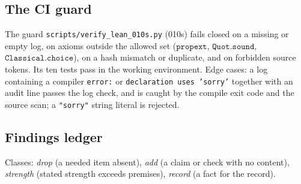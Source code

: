 \documentclass[11pt,a4paper]{article}
\theoremstyle{plain}
\theoremstyle{definition}
\theoremstyle{remark}
\begin{document}
\subsection{The CI guard}
The guard \texttt{scripts/verify\_lean\_010s.py} (010s) fails closed on a missing or empty log, on axioms outside the allowed set ($\texttt{propext}$, $\texttt{Quot.sound}$, $\texttt{Classical.choice}$), on a hash mismatch or duplicate, and on forbidden source tokens. Its ten tests pass in the working environment. Edge cases: a log containing a compiler \texttt{error:} or \texttt{declaration uses 'sorry'} together with an audit line passes the log check, and is caught by the compile exit code and the source scan; a \texttt{"sorry"} string literal is rejected.

\subsection{Findings ledger}
Classes: \emph{drop} (a needed item absent), \emph{add} (a claim or check with no content), \emph{strength} (stated strength exceeds premises), \emph{record} (a fact for the record).
\end{document}
